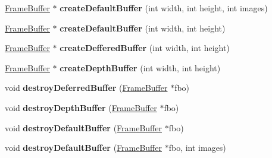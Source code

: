 \begin{DoxyCompactItemize}
\item 
\hypertarget{classEngine_1_1FrameBufferManager_a9ffc47fe8a6824cf2ae4bf6bcc32ea01}{}\hyperlink{classEngine_1_1FrameBuffer}{Frame\+Buffer} $\ast$ {\bfseries create\+Default\+Buffer} (int width, int height, int images)\label{classEngine_1_1FrameBufferManager_a9ffc47fe8a6824cf2ae4bf6bcc32ea01}

\item 
\hypertarget{classEngine_1_1FrameBufferManager_ac428862b54fef584f67fc81edf6d6f2f}{}\hyperlink{classEngine_1_1FrameBuffer}{Frame\+Buffer} $\ast$ {\bfseries create\+Default\+Buffer} (int width, int height)\label{classEngine_1_1FrameBufferManager_ac428862b54fef584f67fc81edf6d6f2f}

\item 
\hypertarget{classEngine_1_1FrameBufferManager_a388f72a6e03ace6d5846ebc169e8cd4a}{}\hyperlink{classEngine_1_1FrameBuffer}{Frame\+Buffer} $\ast$ {\bfseries create\+Deffered\+Buffer} (int width, int height)\label{classEngine_1_1FrameBufferManager_a388f72a6e03ace6d5846ebc169e8cd4a}

\item 
\hypertarget{classEngine_1_1FrameBufferManager_a78f7aff3cfc7ba8c38f0d222ff851444}{}\hyperlink{classEngine_1_1FrameBuffer}{Frame\+Buffer} $\ast$ {\bfseries create\+Depth\+Buffer} (int width, int height)\label{classEngine_1_1FrameBufferManager_a78f7aff3cfc7ba8c38f0d222ff851444}

\item 
\hypertarget{classEngine_1_1FrameBufferManager_a599e75c7cae80242a2c21393acb3ddc0}{}void {\bfseries destroy\+Deferred\+Buffer} (\hyperlink{classEngine_1_1FrameBuffer}{Frame\+Buffer} $\ast$fbo)\label{classEngine_1_1FrameBufferManager_a599e75c7cae80242a2c21393acb3ddc0}

\item 
\hypertarget{classEngine_1_1FrameBufferManager_a3f5d8ef84302fdf9caf105e34b7d4387}{}void {\bfseries destroy\+Depth\+Buffer} (\hyperlink{classEngine_1_1FrameBuffer}{Frame\+Buffer} $\ast$fbo)\label{classEngine_1_1FrameBufferManager_a3f5d8ef84302fdf9caf105e34b7d4387}

\item 
\hypertarget{classEngine_1_1FrameBufferManager_a257e0545524cb15396c050e26cafb81e}{}void {\bfseries destroy\+Default\+Buffer} (\hyperlink{classEngine_1_1FrameBuffer}{Frame\+Buffer} $\ast$fbo)\label{classEngine_1_1FrameBufferManager_a257e0545524cb15396c050e26cafb81e}

\item 
\hypertarget{classEngine_1_1FrameBufferManager_a391f67b58a11ddd782f0e4d0e6cce8c6}{}void {\bfseries destroy\+Default\+Buffer} (\hyperlink{classEngine_1_1FrameBuffer}{Frame\+Buffer} $\ast$fbo, int images)\label{classEngine_1_1FrameBufferManager_a391f67b58a11ddd782f0e4d0e6cce8c6}

\end{DoxyCompactItemize}
